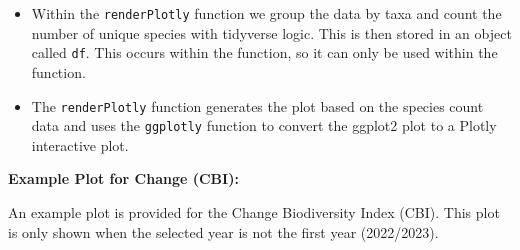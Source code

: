 \documentclass[
]{book}
\newenvironment{Shaded}{\begin{snugshade}}{\end{snugshade}}
\newcommand{\AttributeTok}[1]{\textcolor[rgb]{0.13,0.29,0.53}{#1}}
\newcommand{\CommentTok}[1]{\textcolor[rgb]{0.56,0.35,0.01}{\textit{#1}}}
\newcommand{\DecValTok}[1]{\textcolor[rgb]{0.00,0.00,0.81}{#1}}
\newcommand{\FunctionTok}[1]{\textcolor[rgb]{0.13,0.29,0.53}{\textbf{#1}}}
\newcommand{\NormalTok}[1]{#1}
\newcommand{\OtherTok}[1]{\textcolor[rgb]{0.56,0.35,0.01}{#1}}
\newcommand{\SpecialCharTok}[1]{\textcolor[rgb]{0.81,0.36,0.00}{\textbf{#1}}}
\newcommand{\StringTok}[1]{\textcolor[rgb]{0.31,0.60,0.02}{#1}}
\begin{document}
\begin{itemize}
\item
  Within the \texttt{renderPlotly} function we group the data by taxa and count the number of unique species with tidyverse logic. This is then stored in an object called \texttt{df}. This occurs within the function, so it can only be used within the function.
\item
  The \texttt{renderPlotly} function generates the plot based on the species count data and uses the \texttt{ggplotly} function to convert the ggplot2 plot to a Plotly interactive plot.
\end{itemize}

\textbf{Example Plot for Change (CBI):}

An example plot is provided for the Change Biodiversity Index (CBI). This plot is only shown when the selected year is not the first year (2022/2023).

\begin{Shaded}
\end{Shaded}
\end{document}
